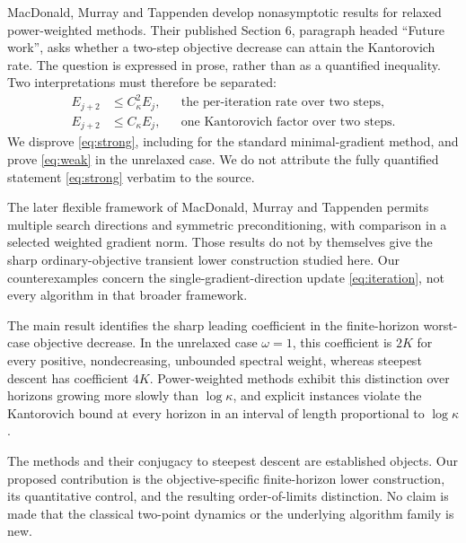 \documentclass[11pt,a4paper]{article}
\theoremstyle{remark}
\newcommand{\Ck}{C_\kappa}
\begin{document}
MacDonald, Murray and Tappenden \cite{MMT2025} develop nonasymptotic results for relaxed power-weighted methods. Their published Section 6, paragraph headed ``Future work'', asks whether a two-step objective decrease can attain the Kantorovich rate. The question is expressed in prose, rather than as a quantified inequality. Two interpretations must therefore be separated:
\begin{align}
 E_{j+2}&\le\Ck^2E_j, &&\text{the per-iteration rate over two steps},\label{eq:strong}\\
 E_{j+2}&\le\Ck E_j, &&\text{one Kantorovich factor over two steps}.\label{eq:weak}
\end{align}
We disprove \eqref{eq:strong}, including for the standard minimal-gradient method, and prove \eqref{eq:weak} in the unrelaxed case. We do not attribute the fully quantified statement \eqref{eq:strong} verbatim to the source.

The later flexible framework of MacDonald, Murray and Tappenden \cite[Definition 8 and Section 2.1, Lemma 9]{MMT2025b} permits multiple search directions and symmetric preconditioning, with comparison in a selected weighted gradient norm. Those results do not by themselves give the sharp ordinary-objective transient lower construction studied here. Our counterexamples concern the single-gradient-direction update \eqref{eq:iteration}, not every algorithm in that broader framework.

The main result identifies the sharp leading coefficient in the finite-horizon worst-case objective decrease. In the unrelaxed case $\omega=1$, this coefficient is $2K$ for every positive, nondecreasing, unbounded spectral weight, whereas steepest descent has coefficient $4K$. Power-weighted methods exhibit this distinction over horizons growing more slowly than $\log\kappa$, and explicit instances violate the Kantorovich bound at every horizon in an interval of length proportional to $\log\kappa$.

The methods and their conjugacy to steepest descent are established objects. Our proposed contribution is the objective-specific finite-horizon lower construction, its quantitative control, and the resulting order-of-limits distinction. No claim is made that the classical two-point dynamics or the underlying algorithm family is new.
\end{document}
